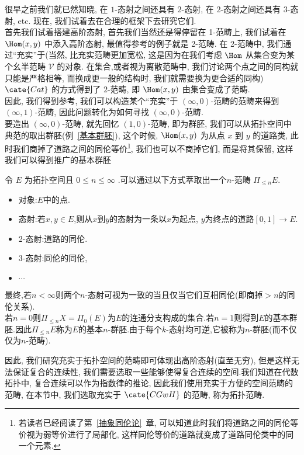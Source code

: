 很早之前我们就已然知晓, 在 $1$-态射之间还具有 $2$-态射, 在 $2$-态射之间还具有 $3$-态射, etc. 现在, 我们试着去在合理的框架下去研究它们.\\
首先我们试着搭建高阶态射, 首先我们当然还是得停留在 1-范畴上, 我们试着在 $\Hom(x,y)$ 中添入高阶态射, 最值得参考的例子就是 2-范畴. 在 2-范畴中, 我们通过``充实''于(当然, 比充实范畴更加宽松, 这是因为在我们考虑 $\Hom$ 从集合变为某个幺半范畴 $\mathcal{V}$ 的对象. 在集合,或者视为离散范畴中, 我们讨论两个点之间的同构就只能是严格相等, 而换成更一般的结构时, 我们就需要换为更合适的同构) $\cate{Cat}$ 的方式得到了 $2$-范畴, 即 $\Hom(x,y)$ 由集合变成了范畴.\\
 因此, 我们得到参考, 我们可以构造某个``充实''于 $(\infty,0)$-范畴的范畴来得到 $(\infty,1)$-范畴, 因此问题转化为如何寻找 $(\infty,0)$-范畴.\\
要造出 $(\infty,0)$-范畴, 就先回忆 $(1,0)$-范畴, 即为群胚, 我们可以从拓扑空间中典范的取出群胚(例~\ref{基本群胚}), 这个时候, $\Hom(x,y)$ 为从点 $x$ 到 $y$ 的道路类, 此时我们商掉了道路之间的同伦等价\footnote{若读者已经阅读了第~\ref{抽象同伦论}~章, 可以知道此时我们将道路之间的同伦等价视为弱等价进行了局部化, 这样同伦等价的道路就变成了道路同伦类中的同一个元素.}, 我们也可以不商掉它们, 而是将其保留, 这样我们可以得到推广的基本群胚
 \begin{example}[基本群胚]\label{Exp:群胚}
    令 $E$ 为拓扑空间且 $0 \leq n \leq \infty$ .可以通过以下方式萃取出一个$n$-范畴 $\Pi_{\leq n} E$. 
    \begin{itemize}
        \item 对象:$E$中的点.
        \item 态射:若$x,y\in E$,则从$x$到$y$的态射为一条以$x$为起点, $y$为终点的道路$[0,1]\to E$.
        \item 2-态射:道路的同伦.
        \item 3-态射:同伦的同伦,
        \item $\cdots$
    \end{itemize}
    最终,若$n < \infty$则两个$n$-态射可视为一致的当且仅当它们互相同伦(即商掉$>n$的同伦关系).\\
    若$n = 0$则$\Pi_{\leq n}X = \Pi_0(E)$为$E$的连通分支构成的集合.若$n = 1$则得到$E$的基本群胚.因此$\Pi_{\leq n}E$称为$E$的基本$n$-群胚.由于每个$k$-态射均可逆,它被称为$n$-群胚(而不仅仅为$n$-范畴).
\end{example}
因此, 我们研究充实于拓扑空间的范畴即可体现出高阶态射(直至无穷), 但是这样无法保证复合的连续性, 我们需要选取一些能够使得复合连续的空间.我们知道在代数拓扑中, 复合连续可以作为指数律的推论, 因此我们使用充实于方便的空间范畴的范畴, 在本节中, 我们选取充实于 $\cate{CGwH}$ 的范畴, 称为拓扑范畴.
